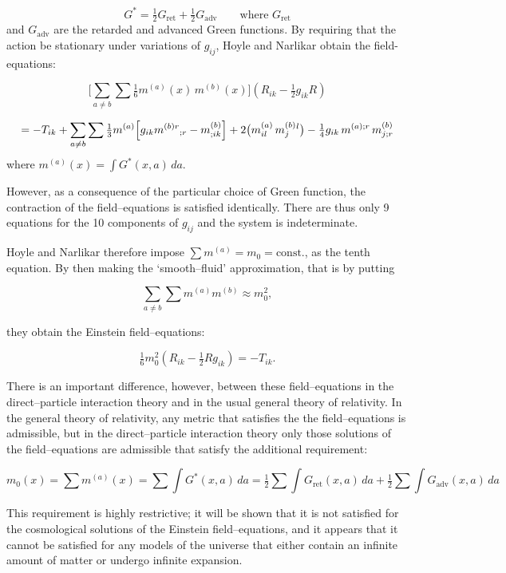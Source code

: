 \[
G^{*} = \tfrac{1}{2} G_{\text{ret}} + \tfrac{1}{2} G_{\text{adv}}
\qquad \text{where } G_{\text{ret}}
\]
and \(G_{\text{adv}}\) are the retarded and advanced Green functions.
By requiring that the action be stationary under variations
of \(g_{ij}\), Hoyle and Narlikar obtain the field-equations:

\[
\Biggl[
\sum_{a \ne b} \sum \tfrac{1}{6} m^{(a)}(x)\, m^{(b)}(x)
\Biggr]
\left( R_{ik} - \tfrac{1}{2} g_{ik} R \right)
\]

\[
= - T_{ik}
+ \sum_{a \ne b} \sum \tfrac{1}{3} m^{(a)}
\Bigl[
g_{ik} m^{(b)r}{}_{;r}
- m^{(b)}_{;ik}
\Bigr]
+ 2 \bigl( m^{(a)}_{il}\, m^{(b)}_{j}{}^{l} \bigr)
- \tfrac{1}{4} g_{ik}\, m^{(a);r}\, m^{(b)}_{j;r}
\]
where \quad 
\( m^{(a)}(x) = \int G^{*}(x,a)\, da \).

\medskip

However, as a consequence of the particular choice of Green function, 
the contraction of the field--equations is satisfied identically. 
There are thus only 9 equations for the 10 components of \( g_{ij} \) 
and the system is indeterminate.

\medskip

Hoyle and Narlikar therefore impose 
\(\sum m^{(a)} = m_{0} = \text{const.}\), as the tenth equation. 
By then making the `smooth--fluid' approximation, that is by putting

\[
\sum_{a \ne b} \sum m^{(a)} m^{(b)} \approx m_{0}^{2},
\]

they obtain the Einstein field--equations:

\[
\tfrac{1}{6} m_{0}^{2}\left( R_{ik} - \tfrac{1}{2} R g_{ik} \right) 
= -T_{ik}.
\]

\medskip

There is an important difference, however, between these field--equations 
in the direct--particle interaction theory and in the usual general theory 
of relativity. In the general theory of relativity, any metric that satisfies the the field--equations is admissible, but in the direct--particle 
interaction theory only those solutions of the field--equations 
are admissible that satisfy the additional requirement:

\[
m_{0}(x) = \sum m^{(a)}(x) = \sum \int G^{*}(x,a)\, da
= \tfrac{1}{2} \sum \int G_{\text{ret}}(x,a)\, da 
+ \tfrac{1}{2} \sum \int G_{\text{adv}}(x,a)\, da
\]

\medskip

This requirement is highly restrictive; it will be shown that it 
is not satisfied for the cosmological solutions of the Einstein 
field--equations, and it appears that it cannot be satisfied for 
any models of the universe that either contain an infinite amount 
of matter or undergo infinite expansion.


